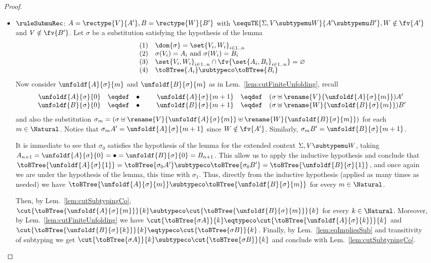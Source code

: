 \begin{proof}
\begin{itemize}
  \item $\ruleSubmuRec$: $A = \rectype{V}{A'}, B = \rectype{W}{B'}$ with
  $\sequTE{\Sigma, V \subtypemu W}{A' \subtypemu B'}, W \notin \fv{A'}$ and $V
  \notin \fv{B'}$. Let $\sigma$ be a substitution satisfying the hypothesis of
  the lemma $$
 \begin{array}{cl}
(1) & \dom{\sigma} = \set{V_i, W_i}_{i \in 1..n} \\
(2) & \sigma(V_i) = A_i \text{ and } \sigma(W_i) = B_i \\
(3) & \set{V_i, W_i}_{i \in 1..n} \cap \fv{\set{A_i, B_i}_{i \in 1..n}} = \varnothing \\
(4) & \toBTree{A_i} \subtypeco \toBTree{B_i}
\end{array} $$
  Now consider $\unfoldf{A}{\sigma}{m}$ and $\unfoldf{B}{\sigma}{m}$ as in
  Lem.~\ref{lem:cutFiniteUnfolding}, recall $$
\begin{array}{rcl}
\unfoldf{A}{\sigma}{0} & \eqdef & \bullet \\
\unfoldf{B}{\sigma}{0} & \eqdef & \bullet
\end{array}
\hspace{.5cm}
\begin{array}{rcl}
\unfoldf{A}{\sigma}{m+1} & \eqdef & (\sigma \uplus \rename{V}{\unfoldf{A}{\sigma}{m}})A' \\
\unfoldf{B}{\sigma}{m+1} & \eqdef & (\sigma \uplus \rename{W}{\unfoldf{B}{\sigma}{m}})B'
\end{array} $$ and also the substitution $\sigma_m = (\sigma \uplus
  \rename{V}{\unfoldf{A}{\sigma}{m}} \uplus
  \rename{W}{\unfoldf{B}{\sigma}{m}})$ for each $m \in \Natural$. Notice that
  $\sigma_m A' = \unfoldf{A}{\sigma}{m+1}$ since $W \notin \fv{A'}$. Similarly,
  $\sigma_m B' = \unfoldf{B}{\sigma}{m+1}$.
  
  It is immediate to see that $\sigma_0$ satisfies the hypothesis of the lemma
  for the extended context $\Sigma, V \subtypemu W$, taking $A_{n+1} =
  \unfoldf{A}{\sigma}{0} = \bullet = \unfoldf{B}{\sigma}{0} = B_{n+1}$. This
  allow us to apply the inductive hypothesis and conclude that
  $\toBTree{\unfoldf{A}{\sigma}{1}} = \toBTree{\sigma_0 A'} \subtypeco
  \toBTree{\sigma_0 B'} = \toBTree{\unfoldf{B}{\sigma}{1}}$, and once again we
  are under the hypothesis of the lemma, this time with $\sigma_1$. Thus,
  directly from the inductive hypothesis (applied as many times as needed) we
  have $\toBTree{\unfoldf{A}{\sigma}{m}} \subtypeco
  \toBTree{\unfoldf{B}{\sigma}{m}}$ for every $m \in \Natural$.
  
  Then, by Lem.~\ref{lem:cutSubtypingCo},
  $\cut{\toBTree{\unfoldf{A}{\sigma}{m}}}{k} \subtypeco
  \cut{\toBTree{\unfoldf{B}{\sigma}{m}}}{k}$ for every $k \in \Natural$.
  Moreover, by Lem.~\ref{lem:cutFiniteUnfolding} we have
  $\cut{\toBTree{\sigma A}}{k} \eqtypeco
  \cut{\toBTree{\unfoldf{A}{\sigma}{k}}}{k}$ and
  $\cut{\toBTree{\unfoldf{B}{\sigma}{k}}}{k} \eqtypeco \cut{\toBTree{\sigma
  B}}{k}$. Finally, by Lem.~\ref{lem:eqImpliesSub} and transitivity of
  subtyping we get $\cut{\toBTree{\sigma A}}{k} \subtypeco \cut{\toBTree{\sigma
  B}}{k}$ and conclude with Lem.~\ref{lem:cutSubtypingCo}.
\end{itemize}
\end{proof}
